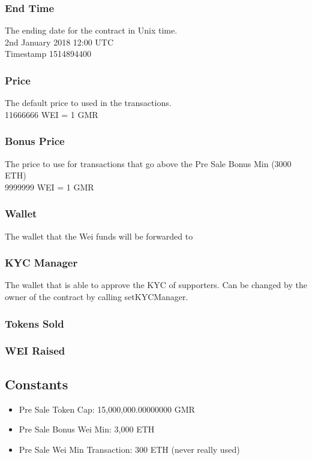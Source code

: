 \documentclass[11pt]{article} %
\begin{document}
\subsubsection{End Time}
The ending date for the contract in Unix time.\\
2nd January 2018 12:00 UTC\\
Timestamp 1514894400 

\subsubsection{Price}
The default price to used in the transactions.\\
11666666 WEI = 1 GMR

\subsubsection{Bonus Price}
The price to use for transactions that go above the Pre Sale Bonus Min (3000 ETH)\\
9999999 WEI = 1 GMR

\subsubsection{Wallet}
The wallet that the Wei funds will be forwarded to

\subsubsection{KYC Manager}
The wallet that is able to approve the KYC of supporters. 
Can be changed by the owner of the contract by calling setKYCManager.

\subsubsection{Tokens Sold}
\subsubsection{WEI Raised}

\subsection{Constants}
\begin{itemize}
\item Pre Sale Token Cap: 15,000,000.00000000 GMR
\item Pre Sale Bonus Wei Min: 3,000 ETH
\item Pre Sale Wei Min Transaction: 300 ETH (never really used)
\end{itemize}
\end{document}
